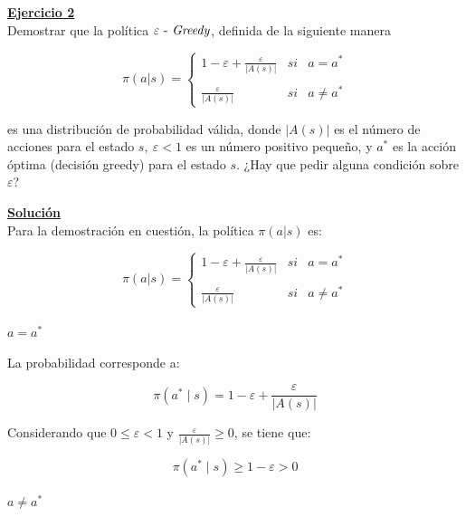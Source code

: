 \indent\underline{\textbf{Ejercicio 2}}\\
Demostrar que la política $\varepsilon \text{ - \textit{Greedy}}$, definida de la siguiente manera

\begin{equation}
    \pi(a|s) = \left\{
    \begin{array}{lcc}
        1 - \varepsilon + \frac{\varepsilon}{|A(s)|} & si & a = a^{\ast}    \\ \\
        \frac{\varepsilon}{|A(s)|} & si & a \neq a^{\ast}
    \end{array}
    \right.\label{eq:equation}
\end{equation}

es una distribución de probabilidad válida, donde $|A(s)|$ es el número de acciones para el estado $s, \ \varepsilon < 1$ es un número positivo pequeño, y $a^{\ast}$ es la acción óptima (decisión greedy) para el estado $s$.
¿Hay que pedir alguna condición sobre $\varepsilon$?

\indent\underline{\textbf{Solución}}\\

Para la demostración en cuestión, la política $\pi(a|s)$ es:

\begin{equation}
    \pi(a|s) = \left\{
    \begin{array}{lcc}
        1 - \varepsilon + \frac{\varepsilon}{|A(s)|} & si & a = a^{\ast}    \\ \\
        \frac{\varepsilon}{|A(s)|} & si & a \neq a^{\ast}
    \end{array}
    \right.
    \label{eq:equation2}
\end{equation}

\paragraph{$a=a^{\ast}$}

La probabilidad corresponde a:

\[
    \pi \left(a^{\ast} \mid s\right) = 1 - \varepsilon + \frac{\varepsilon}{|A(s)|}
\]

Considerando que $0 \leq \varepsilon < 1$ y $\frac{\varepsilon}{|A(s)|} \geq 0$, se tiene que:

\[
    \pi \left(a^{\ast} \mid s\right) \geq 1 - \varepsilon > 0
\]

\paragraph{$a \neq a^{\ast}$}

